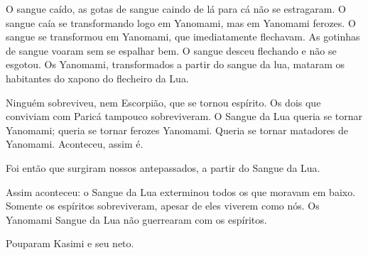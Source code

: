 O sangue caído, as gotas de sangue caindo de lá para cá não se
estragaram. O sangue caía se transformando logo em Yanomami, mas em
Yanomami ferozes. O sangue se transformou em Yanomami, que imediatamente
flechavam. As gotinhas de sangue voaram sem se espalhar bem. O sangue
desceu flechando e não se esgotou. Os Yanomami, transformados a partir
do sangue da lua, mataram os habitantes do xapono do flecheiro da Lua. 

Ninguém sobreviveu, nem Escorpião, que se tornou espírito. Os dois que
conviviam com Paricá tampouco sobreviveram. O Sangue da Lua queria se
tornar Yanomami; queria se tornar ferozes Yanomami. Queria se tornar
matadores de Yanomami. Aconteceu, assim é. 

Foi então que surgiram nossos antepassados, a partir do Sangue da Lua. 

Assim aconteceu: o Sangue da Lua exterminou todos os que moravam em
baixo. Somente os espíritos sobreviveram, apesar de eles viverem como
nós. Os Yanomami Sangue da Lua não guerrearam com os espíritos.

Pouparam Kasimi e seu neto. 

 
